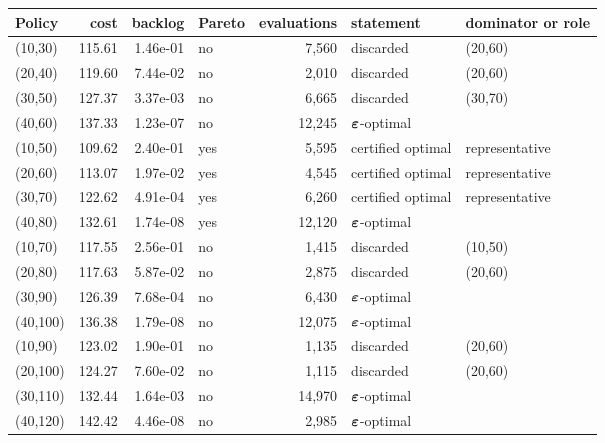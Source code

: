 \begin{tabular}{lrrlrll}
\toprule
Policy & cost & backlog & Pareto & evaluations & statement & dominator or role \\
\midrule
(10,30) & 115.61 & 1.46e-01 & no & 7,560 & discarded & (20,60) \\
(20,40) & 119.60 & 7.44e-02 & no & 2,010 & discarded & (20,60) \\
(30,50) & 127.37 & 3.37e-03 & no & 6,665 & discarded & (30,70) \\
(40,60) & 137.33 & 1.23e-07 & no & 12,245 & $\bm{\varepsilon}$-optimal &  \\
(10,50) & 109.62 & 2.40e-01 & yes & 5,595 & certified optimal & representative \\
(20,60) & 113.07 & 1.97e-02 & yes & 4,545 & certified optimal & representative \\
(30,70) & 122.62 & 4.91e-04 & yes & 6,260 & certified optimal & representative \\
(40,80) & 132.61 & 1.74e-08 & yes & 12,120 & $\bm{\varepsilon}$-optimal &  \\
(10,70) & 117.55 & 2.56e-01 & no & 1,415 & discarded & (10,50) \\
(20,80) & 117.63 & 5.87e-02 & no & 2,875 & discarded & (20,60) \\
(30,90) & 126.39 & 7.68e-04 & no & 6,430 & $\bm{\varepsilon}$-optimal &  \\
(40,100) & 136.38 & 1.79e-08 & no & 12,075 & $\bm{\varepsilon}$-optimal &  \\
(10,90) & 123.02 & 1.90e-01 & no & 1,135 & discarded & (20,60) \\
(20,100) & 124.27 & 7.60e-02 & no & 1,115 & discarded & (20,60) \\
(30,110) & 132.44 & 1.64e-03 & no & 14,970 & $\bm{\varepsilon}$-optimal &  \\
(40,120) & 142.42 & 4.46e-08 & no & 2,985 & $\bm{\varepsilon}$-optimal &  \\
\bottomrule
\end{tabular}
